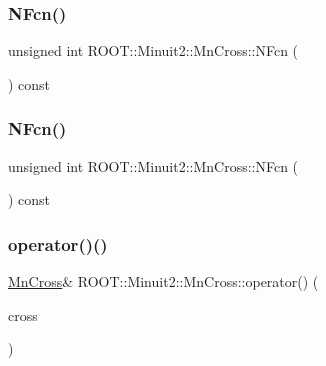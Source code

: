 \subsubsection{\texorpdfstring{NFcn()}{NFcn()}\hspace{0.1cm}{\footnotesize\ttfamily [2/3]}}
{\footnotesize\ttfamily unsigned int R\+O\+O\+T\+::\+Minuit2\+::\+Mn\+Cross\+::\+N\+Fcn (\begin{DoxyParamCaption}{ }\end{DoxyParamCaption}) const\hspace{0.3cm}{\ttfamily [inline]}}

\mbox{\label{classROOT_1_1Minuit2_1_1MnCross_a52cc0559ea27a2d8fe3f9961670e1544}} 
\subsubsection{\texorpdfstring{NFcn()}{NFcn()}\hspace{0.1cm}{\footnotesize\ttfamily [3/3]}}
{\footnotesize\ttfamily unsigned int R\+O\+O\+T\+::\+Minuit2\+::\+Mn\+Cross\+::\+N\+Fcn (\begin{DoxyParamCaption}{ }\end{DoxyParamCaption}) const\hspace{0.3cm}{\ttfamily [inline]}}

\mbox{\label{classROOT_1_1Minuit2_1_1MnCross_a12f4058d5a3b758cbaa68a0a9bc0cebb}} 
\subsubsection{\texorpdfstring{operator()()}{operator()()}\hspace{0.1cm}{\footnotesize\ttfamily [1/3]}}
{\footnotesize\ttfamily \mbox{\hyperlink{classROOT_1_1Minuit2_1_1MnCross}{Mn\+Cross}}\& R\+O\+O\+T\+::\+Minuit2\+::\+Mn\+Cross\+::operator() (\begin{DoxyParamCaption}\item[{const \mbox{\hyperlink{classROOT_1_1Minuit2_1_1MnCross}{Mn\+Cross}} \&}]{cross }\end{DoxyParamCaption})\hspace{0.3cm}{\ttfamily [inline]}}

